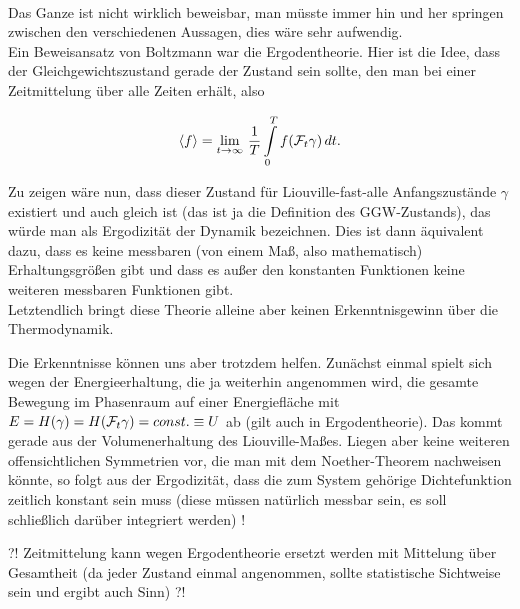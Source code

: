 	\\

Das Ganze ist nicht wirklich beweisbar, man müsste immer hin und her springen zwischen den verschiedenen Aussagen, dies wäre sehr aufwendig.\\
Ein Beweisansatz von Boltzmann war die Ergodentheorie. Hier ist die Idee, dass der Gleichgewichtszustand gerade der Zustand sein sollte, den man bei einer Zeitmittelung über alle Zeiten erhält, also

\begin{equation}\label{eq:ergod}
\expval{f} = \lim_{t \rightarrow \infty} \, \frac{1}{T} \int\limits_0^T f\qty(\mathcal{F}_t \gamma) \, dt .
\end{equation}

Zu zeigen wäre nun, dass dieser Zustand für Liouville-fast-alle Anfangszustände $\gamma$ existiert und auch gleich ist (das ist ja die Definition des GGW-Zustands), das würde man als Ergodizität der Dynamik bezeichnen. Dies ist dann äquivalent dazu, dass es keine messbaren (von einem Maß, also mathematisch) Erhaltungsgrößen gibt und dass es außer den konstanten Funktionen keine weiteren messbaren Funktionen gibt.\\
Letztendlich bringt diese Theorie alleine aber keinen Erkenntnisgewinn über die Thermodynamik.

Die Erkenntnisse können uns aber trotzdem helfen. Zunächst einmal spielt sich wegen der Energieerhaltung, die ja weiterhin angenommen wird, die gesamte Bewegung im Phasenraum auf einer Energiefläche mit $E = H\qty(\gamma) = H\qty(\mathcal{F}_t \gamma) = const. \equiv U$ ab (gilt auch in Ergodentheorie). Das kommt gerade aus der Volumenerhaltung des Liouville-Maßes. Liegen aber keine weiteren offensichtlichen Symmetrien vor, die man mit dem Noether-Theorem nachweisen könnte, so folgt aus der Ergodizität, dass die zum System gehörige Dichtefunktion zeitlich konstant sein muss (diese müssen natürlich messbar sein, es soll schließlich darüber integriert werden) !

?! Zeitmittelung kann wegen Ergodentheorie ersetzt werden mit Mittelung über Gesamtheit (da jeder Zustand einmal angenommen, sollte statistische Sichtweise sein und ergibt auch Sinn) ?!

